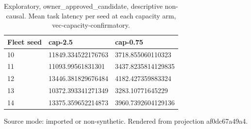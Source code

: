 {
\begin{table}[htbp]
\centering
\caption{Exploratory, owner\_approved\_candidate, descriptive non-causal. Mean task latency per seed at each capacity arm, vec-capacity-confirmatory.}
\label{tab:traffictwin-metrics-af0dc67a49a4}
\small
\renewcommand{\arraystretch}{1.15}
\begin{tabular}{lll}
\hline
Fleet seed & cap-2.5 & cap-0.75 \\
\hline
10 & 11849.334522176763 & 3718.855060110323 \\
11 & 11093.99561831301 & 3437.8235814129835 \\
12 & 13446.381829676484 & 4182.427359883324 \\
13 & 10372.393341271349 & 3283.10771645229 \\
14 & 13375.359652214873 & 3960.7392604129136 \\
\hline
\end{tabular}
\par\footnotesize
Source mode: imported or non-synthetic.
Rendered from projection af0dc67a49a4.
\end{table}
}
